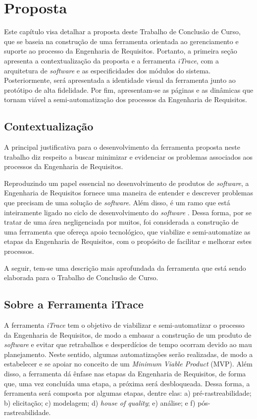 \chapter[Proposta]{Proposta}

Este capítulo visa detalhar a proposta deste Trabalho de Conclusão de Curso, que se baseia na construção de uma ferramenta orientada ao gerenciamento e suporte ao processo da Engenharia de Requisitos. Portanto, a primeira seção apresenta a contextualização da proposta e a ferramenta \textit{iTrace}, com a arquitetura de \textit{software} e as especificidades dos módulos do sistema. Posteriormente, será apresentada a identidade visual da ferramenta junto ao protótipo de alta fidelidade. Por fim, apresentam-se as páginas e as dinâmicas que tornam viável a semi-automatização dos processos da Engenharia de Requisitos.

\section{Contextualização}
A principal justificativa para o desenvolvimento da ferramenta proposta neste trabalho diz respeito a buscar minimizar e evidenciar os problemas associados aos processos da Engenharia de Requisitos.

Reproduzindo um papel essencial no desenvolvimento de produtos de \textit{software}, a Engenharia de Requisitos fornece uma maneira de entender e descrever problemas que precisam de uma solução de \textit{software}. Além disso, é um ramo que está inteiramente ligado no ciclo de desenvolvimento do \textit{software} \cite{elliott2012software}. Dessa forma, por se tratar de uma área negligenciada por muitos, foi considerada a construção de uma ferramenta que ofereça apoio tecnológico, que viabilize e semi-automatize as etapas da Engenharia de Requisitos, com o propósito de facilitar e melhorar estes processos.

A seguir, tem-se uma descrição mais aprofundada da ferramenta que está sendo elaborada para o Trabalho de Conclusão de Curso.

\section{Sobre a Ferramenta iTrace}
A ferramenta \textit{iTrace} tem o objetivo de viabilizar e semi-automatizar o processo da Engenharia de Requisitos, de modo a embasar a construção de um produto de \textit{software} e evitar que retrabalhos e desperdícios de tempo ocorram devido ao mau planejamento. Neste sentido, algumas automatizações serão realizadas, de modo a estabelecer e se apoiar no conceito de um \textit{Minimum Viable Product} (MVP). Além disso, a ferramenta dá ênfase nas etapas da Engenharia de Requisitos, de forma que, uma vez concluída uma etapa, a próxima será desbloqueada. Dessa forma, a ferramenta será composta por algumas etapas, dentre elas: a) pré-rastreabilidade; b) elicitação; c) modelagem; d) \textit{house of quality}; e) análise; e f) pós-rastreabilidade. 

